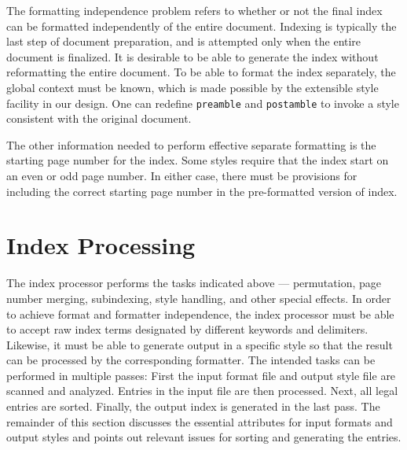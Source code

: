 The formatting independence problem refers to whether or not the final index
can be formatted independently of the entire document.
Indexing is typically the last step of document preparation, and
is attempted only when the entire document is finalized.
It is desirable to be able to generate the index without
reformatting the entire document.  To be able to format
the index separately, the global context must be known, which is made possible
by the extensible style facility in our design.
One can redefine \verb|preamble| and \verb|postamble| to
invoke a style consistent with the original document.

The other information needed to perform effective separate formatting
is the starting page number for the index.
Some styles require that the index
start on an even or odd page number.
In either case, there must be provisions for including the correct
starting page number in the pre-formatted version of index.


\section{Index Processing}
The index processor performs the tasks indicated above ---
permutation, page number merging, subindexing, style handling, and other
special effects.  In order to achieve format and formatter independence,
the index processor must be able to accept raw index
terms designated by different keywords and delimiters.
Likewise, it must be able to generate output in a specific style
so that the result can be processed by the corresponding formatter.
The intended tasks can be performed in multiple passes:
First the input format file and output style file are scanned and analyzed.
Entries in the input file are then processed.  Next, all legal entries are
sorted.  Finally, the output index is generated in the last pass.
The remainder of this section discusses the essential attributes
for input formats and output styles and points out relevant issues
for sorting and generating the entries.


